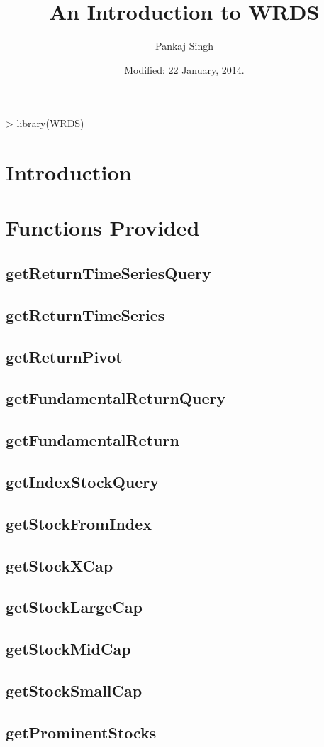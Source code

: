 \documentclass{article}
\title{An Introduction to WRDS}
\author{Pankaj Singh}
\date{Modified: 22 January, 2014. }
\begin{document}


\maketitle

\tableofcontents


\begin{Schunk}
\begin{Sinput}
> library(WRDS)
\end{Sinput}
\end{Schunk}

\section{Introduction}

\section{Functions Provided}

\subsection{getReturnTimeSeriesQuery}
\subsection{getReturnTimeSeries}
\subsection{getReturnPivot}
\subsection{getFundamentalReturnQuery}
\subsection{getFundamentalReturn}

\subsection{getIndexStockQuery}
\subsection{getStockFromIndex}
\subsection{getStockXCap}
\subsection{getStockLargeCap}
\subsection{getStockMidCap}
\subsection{getStockSmallCap}
\subsection{getProminentStocks}
\end{document}
